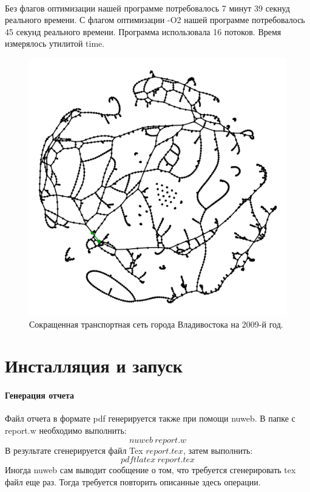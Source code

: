 \documentclass[12pt]{article}
\begin{document}
\paragraph{}

Без флагов оптимизации нашей программе потребовалось 7 минут 39 секнуд реального времени.
С флагом оптимизации -O2 нашей программе потребовалось 45 секунд реального времени.
Программа использовала 16 потоков. Время измерялось утилитой time.

\begin{figure}[h]
    \centering
    \includegraphics[scale=0.3]{vlad_2009_min.png}
    \caption{Сокращенная транспортная сеть города Владивостока на 2009-й год.}
    \label{fig:vlad_2009_min}
\end{figure}

\section {Инсталляция и запуск}

\paragraph{Генерация отчета}
Файл отчета в формате pdf генерируется также при помощи nuweb. В папке с report.w необходимо выполнить:
$$nuweb\ report.w$$
В результате сгенерируется файл Tex $report.tex$, затем выполнить:
$$pdftlatex\ report.tex$$
Иногда nuweb сам выводит сообщение о том, что требуется сгенерировать tex файл еще раз. Тогда требуется повторить описанные здесь операции.
\end{document}
